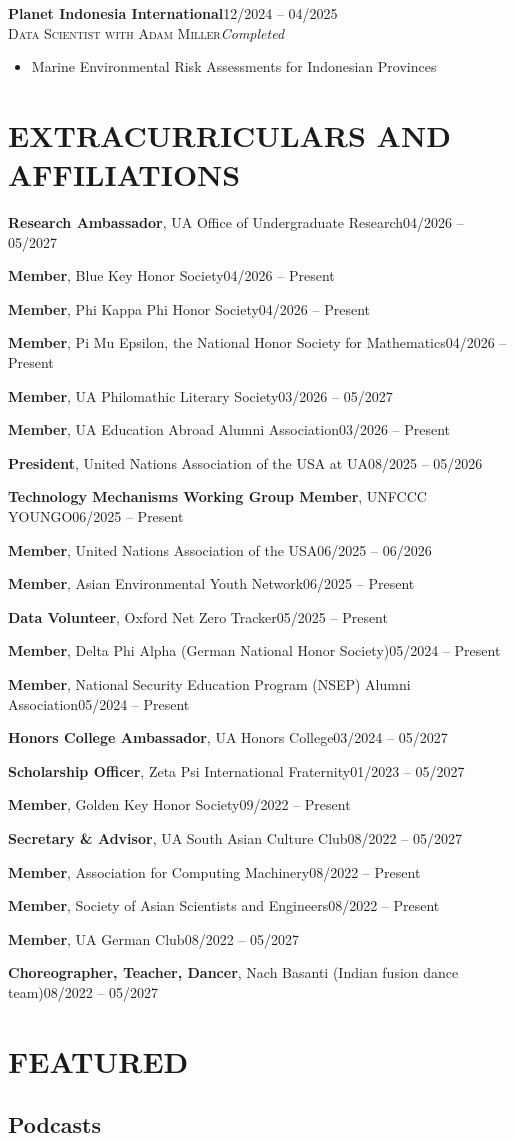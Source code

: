 \documentclass[a4paper,9pt]{extarticle}
\newcommand{\empitem}[2]{\noindent#1\hfill#2\par\vspace{2pt}}
\newcommand{\projitem}[5]{%
  \noindent\textbf{#1}\hfill#4\\[1pt]
  \textsc{#2}\hfill\textit{#5}
  \begin{itemize}[leftmargin=1.5em, topsep=4pt, partopsep=0pt, itemsep=0pt]
    \item #3
  \end{itemize}
  \vspace{6pt}
}
\begin{document}
\projitem{Planet Indonesia International}
  {Data Scientist with Adam Miller}
  {Marine Environmental Risk Assessments for Indonesian Provinces}
  {12/2024 -- 04/2025}
  {Completed}

\section*{EXTRACURRICULARS AND AFFILIATIONS}
\empitem{\textbf{Research Ambassador}, UA Office of Undergraduate Research}{04/2026 -- 05/2027}
\empitem{\textbf{Member}, Blue Key Honor Society}{04/2026 -- Present}
\empitem{\textbf{Member}, Phi Kappa Phi Honor Society}{04/2026 -- Present}

\empitem{\textbf{Member}, Pi Mu Epsilon, the National Honor Society for Mathematics}{04/2026 -- Present}
\empitem{\textbf{Member}, UA Philomathic Literary Society}{03/2026 -- 05/2027}
\empitem{\textbf{Member}, UA Education Abroad Alumni Association}{03/2026 -- Present}
\empitem{\textbf{President}, United Nations Association of the USA at UA}{08/2025 -- 05/2026}
\empitem{\textbf{Technology Mechanisms Working Group Member}, UNFCCC YOUNGO}{06/2025 -- Present}
\empitem{\textbf{Member}, United Nations Association of the USA}{06/2025 -- 06/2026}
\empitem{\textbf{Member}, Asian Environmental Youth Network}{06/2025 -- Present}
\empitem{\textbf{Data Volunteer}, Oxford Net Zero Tracker}{05/2025 -- Present}
\empitem{\textbf{Member}, Delta Phi Alpha (German National Honor Society)}{05/2024 -- Present}
\empitem{\textbf{Member}, National Security Education Program (NSEP) Alumni Association}{05/2024 -- Present}
\empitem{\textbf{Honors College Ambassador}, UA Honors College}{03/2024 -- 05/2027}
\empitem{\textbf{Scholarship Officer}, Zeta Psi International Fraternity}{01/2023 -- 05/2027}
\empitem{\textbf{Member}, Golden Key Honor Society}{09/2022 -- Present}
\empitem{\textbf{Secretary \& Advisor}, UA South Asian Culture Club}{08/2022 -- 05/2027}
\empitem{\textbf{Member}, Association for Computing Machinery}{08/2022 -- Present}
\empitem{\textbf{Member}, Society of Asian Scientists and Engineers}{08/2022 -- Present}
\empitem{\textbf{Member}, UA German Club}{08/2022 -- 05/2027}
\empitem{\textbf{Choreographer, Teacher, Dancer}, Nach Basanti (Indian fusion dance team)}{08/2022 -- 05/2027}


\section*{FEATURED}
    \subsection*{Podcasts}
       
\end{document}
